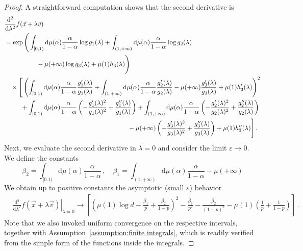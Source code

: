 \documentclass[aps,pra,11pt,onecolumn,nofootinbib,tightenlines]{revtex4-2}
\theoremstyle{definition}
\def \d {\mathrm{d}}
\begin{document}
\begin{proof}
A straightforward computation shows that the second derivative is
\begin{align}
    &\frac{\d^2}{\d \lambda^2}f(\vec{x}+\lambda\vec{v}) \\
    & = \exp\Bigg(\int_{[0,1)}\d \mu(\alpha)\frac{\alpha}{1-\alpha}\log{g_1(\lambda)}+\int_{(1,+\infty)}\d \mu(\alpha)\frac{\alpha}{1-\alpha}\log{g_2(\lambda)} \notag\\
    &\hspace{5em}-\mu( +\infty) \log g_3(\lambda) + \mu(1)h_3(\lambda) \Bigg) \notag \\
    & \quad  \times \Bigg[\left(\int_{[0,1)}\d \mu(\alpha)\frac{\alpha}{1-\alpha}\frac{g'_1(\lambda)}{g_1(\lambda)}+\int_{(1,+\infty)}\d \mu(\alpha)\frac{\alpha}{1-\alpha}\frac{g'_2(\lambda)}{g_2(\lambda)} -\mu( +\infty)\frac{g_3'(\lambda)}{g_3(\lambda)} + \mu(1)h_3'(\lambda)\right)^2 \notag\\
    &\;\;\qquad +\int_{[0,1)}\d \mu(\alpha)\frac{\alpha}{1-\alpha}\left(-\frac{g'_1(\lambda)^2}{g_1(\lambda)^2}+\frac{g''_1 (\lambda)}{g_1(\lambda)}\right)+ \int_{( 1,+\infty)}\d \mu(\alpha)\frac{\alpha}{1-\alpha}\left(-\frac{g'_2(\lambda)^2}{g_2(\lambda)^2}+\frac{g''_2 (\lambda)}{g_2(\lambda)}\right)\notag \\
    &  \hspace{19.2 em}- \mu(+\infty)\left(-\frac{g'_3(\lambda)^2}{g_3(\lambda)^2}+\frac{g''_3 (\lambda)}{g_3(\lambda)}\right) + \mu(1)h_3''(\lambda) \Bigg]\,.
\end{align}
Next, we evaluate the second derivative in $\lambda=0$ and consider the limit $\varepsilon \rightarrow 0$. We define the constants 
\begin{equation}
\beta_2=\int_{[0.1)} \d \mu(\alpha) \frac{\alpha}{1-\alpha} \,, \quad \beta_1=\int_{(1,+\infty)} \d\mu(\alpha) \frac{\alpha}{1-\alpha}  - \mu(+\infty)
\end{equation}
We obtain up to positive constants the asymptotic (small $\varepsilon$) behavior
\begin{align}
    &\left.\frac{\d^2 }{\d\lambda^2}f(\vec{x}+\lambda\vec{v})\right\vert_{\lambda=0}  \rightarrow \left[\left(\mu(1)\log{d}-\frac{\beta_1}{p}+\frac{\beta_2}{1-p}\right)^2-\frac{\beta_1}{p^2}-\frac{\beta_2}{(1-p)^2}- \mu(1)\left(\frac{1}{p}+\frac{1}{1-p}\right)\right] \,.
\end{align}
Note that we also invoked uniform convergence on the respective intervals, together with Assumption~\ref{assumption:finite integrals}, which is readily verified from the simple form of the functions inside the integrals.

\end{proof}
\end{document}
